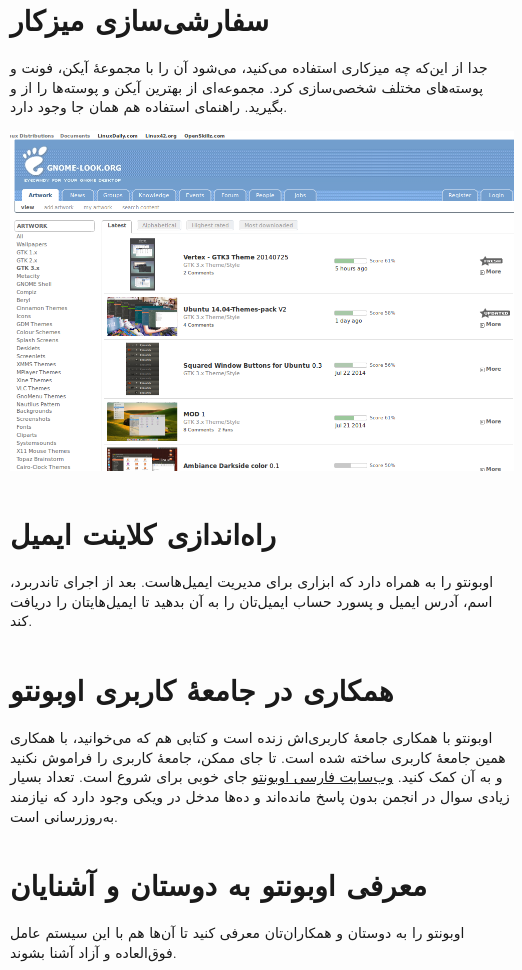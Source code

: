 \section{سفارشی‌سازی میزکار}
جدا از این‌که چه میزکاری استفاده می‌کنید، می‌شود آن را با مجموعهٔ آیکن، فونت و پوسته‌های مختلف شخصی‌سازی کرد. مجموعه‌ای از بهترین آیکن و پوسته‌ها را از  و  بگیرید. راهنمای استفاده هم همان جا وجود دارد.
\begin{center}
\includegraphics[scale=0.4]{pics/34.png}
\end{center}

\section{راه‌اندازی کلاینت ایمیل}
اوبونتو  را به همراه دارد که ابزاری برای مدیریت ایمیل‌هاست. بعد از اجرای تاندربرد، اسم، آدرس ایمیل و پسورد حساب ایمیل‌تان را به آن بدهید تا ایمیل‌هایتان را دریافت کند.

\section{همکاری در جامعهٔ کاربری اوبونتو}
اوبونتو با همکاری جامعهٔ کاربری‌اش زنده است و کتابی هم که می‌خوانید، با همکاری همین جامعهٔ کاربری ساخته شده است. تا جای ممکن، جامعهٔ کاربری را فراموش نکنید و به آن کمک کنید. \href{http://www.ubuntu.ir}{وب‌سایت فارسی اوبونتو} جای خوبی برای شروع است. تعداد بسیار زیادی سوال در انجمن بدون پاسخ مانده‌اند و ده‌ها مدخل در ویکی وجود دارد که نیازمند به‌روزرسانی است.

\section{معرفی اوبونتو به دوستان و آشنایان}
اوبونتو را به دوستان و همکاران‌تان معرفی کنید تا آن‌ها هم با این سیستم عامل فوق‌العاده و آزاد آشنا بشوند.
